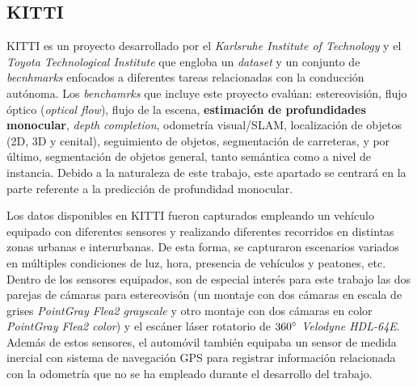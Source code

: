 \subsection{KITTI}
KITTI \cite{KITTI-dataset, KITTI-benchmarks, KITTI-road-benchmark, KITTI-sceneflow-benchmark} es un proyecto desarrollado por el \textit{Karlsruhe Institute of Technology} y el \textit{Toyota Technological Institute} que engloba un \textit{dataset} y un conjunto de \textit{becnhmarks} enfocados a diferentes tareas relacionadas con la conducción autónoma. Los \textit{benchamrks} que incluye este proyecto evalúan: estereovisión, flujo óptico (\textit{optical flow}), flujo de la escena, \textbf{estimación de profundidades monocular}, \textit{depth completion}, odometría visual/SLAM, localización de objetos (2D, 3D y cenital), seguimiento de objetos, segmentación de carreteras, y por último, segmentación de objetos general, tanto semántica como a nivel de instancia. Debido a la naturaleza de este trabajo, este apartado se centrará en la parte referente a la predicción de profundidad monocular.

Los datos disponibles en KITTI fueron capturados empleando un vehículo equipado con diferentes sensores y realizando diferentes recorridos en distintas zonas urbanas e interurbanas. De esta forma, se capturaron escenarios variados en múltiples condiciones de luz, hora, presencia de vehículos y peatones, etc. Dentro de los sensores equipados, son de especial interés para este trabajo las dos parejas de cámaras para estereovisón (un montaje con dos cámaras en escala de grises \textit{PointGray Flea2 grayscale} y otro montaje con dos cámaras en color \textit{PointGray Flea2 color}) y el escáner láser rotatorio de $360\degree$ \textit{Velodyne HDL-64E}. Además de estos sensores, el automóvil también equipaba un sensor de medida inercial con sistema de navegación GPS para registrar información relacionada con la odometría que no se ha empleado durante el desarrollo del trabajo.

 
 

